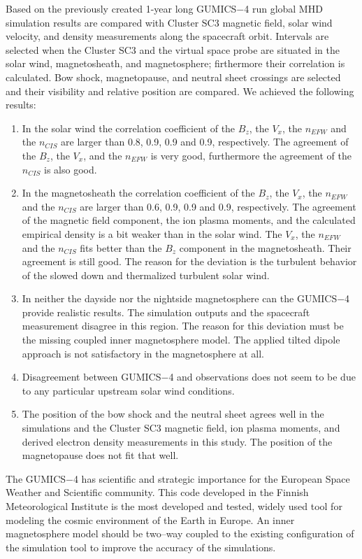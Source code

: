 \documentclass[draft]{agujournal2019}
\begin{document}
Based on the previously created 1-year long GUMICS$-$4 run global MHD simulation results are compared with Cluster SC3 magnetic field, solar wind velocity, and density measurements along the spacecraft orbit. Intervals are selected when the Cluster SC3 and the virtual space probe are situated in the solar wind, magnetosheath, and magnetosphere; firthermore their correlation is calculated. Bow shock, magnetopause, and neutral sheet crossings are selected and their visibility and relative position are compared. We achieved the following results:
\begin{enumerate}
\item In the solar wind the correlation coefficient of the $B_{z}$, the $V_{x}$, the $n_{EFW}$ and the $n_{CIS}$ are larger than 0.8, 0.9, 0.9 and 0.9, respectively. The agreement of the $B_{z}$, the $V_{x}$, and the $n_{EFW}$ is very good, furthermore the agreement of the $n_{CIS}$ is also good. 
\item In the magnetosheath the correlation coefficient of the $B_{z}$, the $V_{x}$, the $n_{EFW}$ and the $n_{CIS}$ are larger than 0.6, 0.9, 0.9 and 0.9, respectively. The agreement of the magnetic field component, the ion plasma moments, and the calculated empirical density is a bit weaker than in the solar wind. The $V_{x}$, the $n_{EFW}$ and the $n_{CIS}$ fits better than the $B_{z}$ component in the magnetosheath. Their agreement is still good. The reason for the deviation is the turbulent behavior of the slowed down and thermalized turbulent solar wind.
\item In neither the dayside nor the nightside magnetosphere can the GUMICS$-$4 provide realistic results. The simulation outputs and the spacecraft measurement disagree in this region. The reason for this deviation must be the missing coupled inner magnetosphere model. The applied tilted dipole approach is not satisfactory in the magnetosphere at all. 
\item Disagreement between GUMICS$-$4 and observations does not seem to be due to any particular upstream solar wind conditions.
\item The position of the bow shock and the neutral sheet agrees well in the simulations and the Cluster SC3 magnetic field, ion plasma moments, and derived electron density measurements in this study. The position of the magnetopause does not fit that well.
\end{enumerate}
The GUMICS$-$4 has scientific and strategic importance for the European Space Weather and Scientific community. This code developed in the Finnish Meteorological Institute is the most developed and tested, widely used tool for modeling the cosmic environment of the Earth in Europe. An inner magnetosphere model should be two--way coupled to the existing configuration of the simulation tool to improve the accuracy of the simulations.
\end{document}
